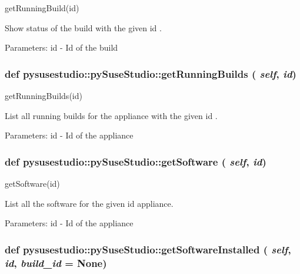 \label{classpysusestudio_1_1py_suse_studio_a1b5b2d3eb030841b1d50117cb081d935}
\begin{DoxyVerb}getRunningBuild(id)

       Show status of the build with the given id .
        
            Parameters:
id - Id of the build

\end{DoxyVerb}
 \hypertarget{classpysusestudio_1_1py_suse_studio_a605349d59cf89acb5aabe7b810c9de41}{
\subsubsection[{getRunningBuilds}]{\setlength{\rightskip}{0pt plus 5cm}def pysusestudio::pySuseStudio::getRunningBuilds ( {\em self}, \/   {\em id})}}
\label{classpysusestudio_1_1py_suse_studio_a605349d59cf89acb5aabe7b810c9de41}
\begin{DoxyVerb}getRunningBuilds(id)

        List all running builds for the appliance with the given id .
        
            Parameters:
id - Id of the appliance

\end{DoxyVerb}
 \hypertarget{classpysusestudio_1_1py_suse_studio_a629c7120bc2bb4bcbb3f5bd687b7a81b}{
\subsubsection[{getSoftware}]{\setlength{\rightskip}{0pt plus 5cm}def pysusestudio::pySuseStudio::getSoftware ( {\em self}, \/   {\em id})}}
\label{classpysusestudio_1_1py_suse_studio_a629c7120bc2bb4bcbb3f5bd687b7a81b}
\begin{DoxyVerb}getSoftware(id)

        List all the software for the given id appliance.  
            
            Parameters:
id - Id of the appliance

\end{DoxyVerb}
 \hypertarget{classpysusestudio_1_1py_suse_studio_a9ee9e20b9c942e502c1d45552d118c18}{
\subsubsection[{getSoftwareInstalled}]{\setlength{\rightskip}{0pt plus 5cm}def pysusestudio::pySuseStudio::getSoftwareInstalled ( {\em self}, \/   {\em id}, \/   {\em build\_\-id} = {\ttfamily None})}}
